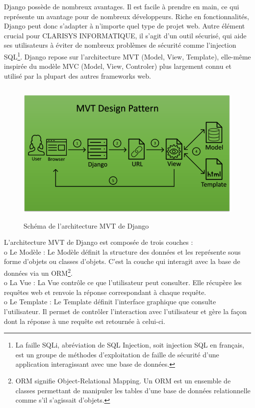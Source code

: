 Django possède de nombreux avantages. Il est facile à prendre en main, ce qui représente un avantage 
pour de nombreux développeurs. Riche en fonctionnalités, Django peut donc s’adapter à n’importe 
quel type de projet web. 
Autre élément crucial pour CLARISYS INFORMATIQUE, il s’agit d’un outil sécurisé, qui aide ses 
utilisateurs à éviter de nombreux problèmes de sécurité comme l’injection SQL\footnote[5]{La faille SQLi, 
abréviation de SQL Injection, soit injection SQL en français, est un groupe de méthodes d'exploitation
 de faille de sécurité d'une application interagissant avec une base de données.}. Django repose sur 
l’architecture MVT (Model, View, Template), elle-même inspirée du modèle MVC (Model, View, Controler) 
plus largement connu et utilisé par la plupart des autres frameworks web.
\begin{figure}[hp]
    \centering
    \includegraphics[width=400pt,height=200pt]{images/django_pattern.png}
    \caption{Schéma de l'architecture MVT de Django}
\end{figure}

L’architecture MVT de Django est composée de trois couches :\\
o	Le Modèle : Le Modèle définit la structure des données et les représente sous forme d’objets ou 
classes d’objets. C’est la couche qui interagit avec la base de données via un ORM\footnote[6]{ORM signifie 
Object-Relational Mapping. Un ORM est un ensemble de classes permettant de manipuler les tables d'une 
base de données relationnelle comme s'il s'agissait d'objets.}.\\
o	La Vue : La Vue contrôle ce que l’utilisateur peut consulter. Elle récupère les requêtes web et 
renvoie la réponse correspondant à chaque requête.\\
o	Le Template : Le Template définit l’interface graphique que consulte l’utilisateur.
Il permet de contrôler l’interaction avec l’utilisateur et gère la façon dont la réponse à une 
requête est retournée à celui-ci.\\
\pagebreak

